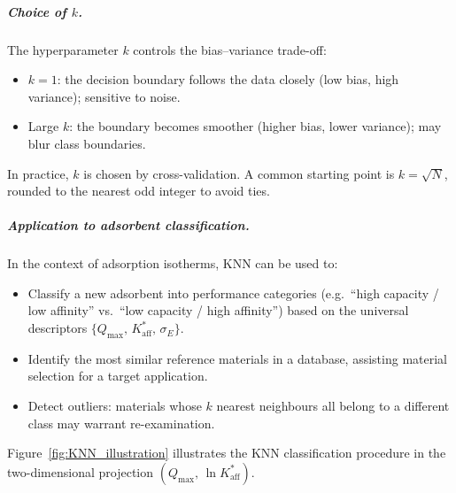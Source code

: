 \documentclass[12pt]{article}
\begin{document}
	\subparagraph{Choice of $k$.}
	The hyperparameter $k$ controls the bias--variance trade-off:
	\begin{itemize}
		\item $k = 1$: the decision boundary follows the data
		closely (low bias, high variance); sensitive to noise.
		\item Large $k$: the boundary becomes smoother (higher bias,
		lower variance); may blur class boundaries.
	\end{itemize}
	In practice, $k$ is chosen by cross-validation. A common
	starting point is $k = \sqrt{N}$, rounded to the nearest odd
	integer to avoid ties.

	\subparagraph{Application to adsorbent classification.}
	In the context of adsorption isotherms, KNN can be used to:
	\begin{itemize}
		\item Classify a new adsorbent into performance categories
		(e.g.\ ``high capacity / low affinity'' vs.\ ``low capacity
		/ high affinity'') based on the universal descriptors
		$\{Q_{\max},\, K_{\mathrm{aff}}^{\ast},\, \sigma_E\}$.
		\item Identify the most similar reference materials in a
		database, assisting material selection for a target
		application.
		\item Detect outliers: materials whose $k$ nearest neighbours
		all belong to a different class may warrant re-examination.
	\end{itemize}

	Figure~\ref{fig:KNN_illustration} illustrates the KNN
	classification procedure in the two-dimensional projection
	$(Q_{\max},\, \ln K_{\mathrm{aff}}^{\ast})$.
\end{document}
